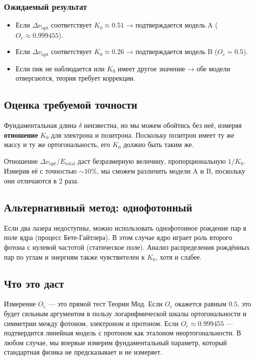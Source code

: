 \documentclass[12pt,a4paper]{article}
\begin{document}
\subsubsection{Ожидаемый результат}
\begin{itemize}
    \item Если $\Delta\nu_{\text{opt}}$ соответствует $K_0 \approx 0.51$ → подтверждается модель A ($O_e \approx 0.999455$).
    \item Если $\Delta\nu_{\text{opt}}$ соответствует $K_0 \approx 0.26$ → подтверждается модель B ($O_e = 0.5$).
    \item Если пик не наблюдается или $K_0$ имеет другое значение → обе модели отвергаются, теория требует коррекции.
\end{itemize}

\subsection{Оценка требуемой точности}
Фундаментальная длина $\delta$ неизвестна, но мы можем обойтись без неё, измеряя \textbf{отношение} $K_0$ для электрона и позитрона. Поскольку позитрон имеет ту же массу и ту же ортогональность, его $K_0$ должно быть таким же.

Отношение $\Delta\nu_{\text{opt}} / E_{\text{total}}$ даст безразмерную величину, пропорциональную $1/K_0$. Измерив её с точностью $\sim 10\%$, мы сможем различить модели A и B, поскольку они отличаются в 2 раза.

\subsection{Альтернативный метод: однофотонный}
Если два лазера недоступны, можно использовать однофотонное рождение пар в поле ядра (процесс Бете-Гайтлера). В этом случае ядро играет роль второго фотона с нулевой частотой (статическое поле). Анализ распределения рождённых пар по углам и энергиям также чувствителен к $K_0$, хотя и слабее.

\subsection{Что это даст}
Измерение $O_e$ — это прямой тест Теории Мод. Если $O_e$ окажется равным $0.5$, это будет сильным аргументом в пользу логарифмической шкалы ортогональности и симметрии между фотоном, электроном и протоном. Если $O_e \approx 0.999455$ — подтвердится линейная модель с протоном как эталоном неортогональности. В любом случае, мы впервые измерим фундаментальный параметр, который стандартная физика не предсказывает и не измеряет.
\end{document}
